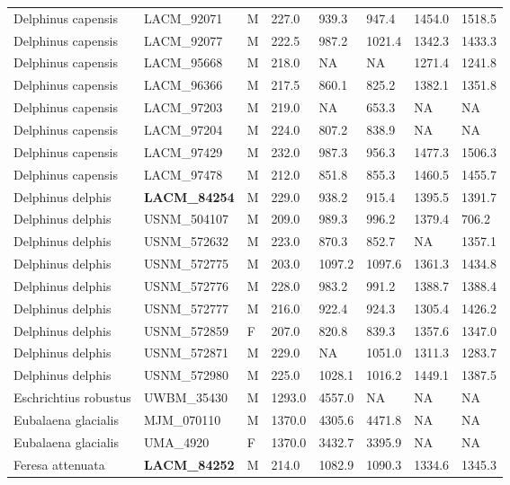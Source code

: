 \begin{longtable}{|p{1.95in}p{1.1in}p{.15in}p{.4in}p{.4in}p{.4in}p{.4in}p{.4in}|}
  Delphinus capensis & LACM\_92071 & M & 227.0 & 939.3 & 947.4 & 1454.0 & 1518.5 \\ 
  Delphinus capensis & LACM\_92077 & M & 222.5 & 987.2 & 1021.4 & 1342.3 & 1433.3 \\ 
  Delphinus capensis & LACM\_95668 & M & 218.0 & NA & NA & 1271.4 & 1241.8 \\ 
  Delphinus capensis & LACM\_96366 & M & 217.5 & 860.1 & 825.2 & 1382.1 & 1351.8 \\ 
  Delphinus capensis & LACM\_97203 & M & 219.0 & NA & 653.3 & NA & NA  \\ 
  Delphinus capensis & LACM\_97204 & M & 224.0 & 807.2 & 838.9 & NA & NA  \\ 
  Delphinus capensis & LACM\_97429 & M & 232.0 & 987.3 & 956.3 & 1477.3 & 1506.3 \\ 
  Delphinus capensis & LACM\_97478 & M & 212.0 & 851.8 & 855.3 & 1460.5 & 1455.7 \\ 
  Delphinus delphis & \textbf{ LACM\_84254 } & M & 229.0 & 938.2 & 915.4 & 1395.5 & 1391.7 \\ 
  Delphinus delphis & USNM\_504107 & M & 209.0 & 989.3 & 996.2 & 1379.4 & 706.2 \\ 
  Delphinus delphis & USNM\_572632 & M & 223.0 & 870.3 & 852.7 & NA & 1357.1 \\ 
  Delphinus delphis & USNM\_572775 & M & 203.0 & 1097.2 & 1097.6 & 1361.3 & 1434.8 \\ 
  Delphinus delphis & USNM\_572776 & M & 228.0 & 983.2 & 991.2 & 1388.7 & 1388.4 \\ 
  Delphinus delphis & USNM\_572777 & M & 216.0 & 922.4 & 924.3 & 1305.4 & 1426.2 \\ 
  Delphinus delphis & USNM\_572859 & F & 207.0 & 820.8 & 839.3 & 1357.6 & 1347.0 \\ 
  Delphinus delphis & USNM\_572871 & M & 229.0 & NA & 1051.0 & 1311.3 & 1283.7 \\ 
  Delphinus delphis & USNM\_572980 & M & 225.0 & 1028.1 & 1016.2 & 1449.1 & 1387.5 \\ 
  Eschrichtius robustus & UWBM\_35430 & M & 1293.0 & 4557.0 & NA & NA & NA  \\ 
  Eubalaena glacialis & MJM\_070110 & M & 1370.0 & 4305.6 & 4471.8 & NA & NA  \\ 
  Eubalaena glacialis & UMA\_4920 & F & 1370.0 & 3432.7 & 3395.9 & NA & NA  \\ 
  Feresa attenuata & \textbf{ LACM\_84252 } & M & 214.0 & 1082.9 & 1090.3 & 1334.6 & 1345.3 \\ 

\end{longtable}

